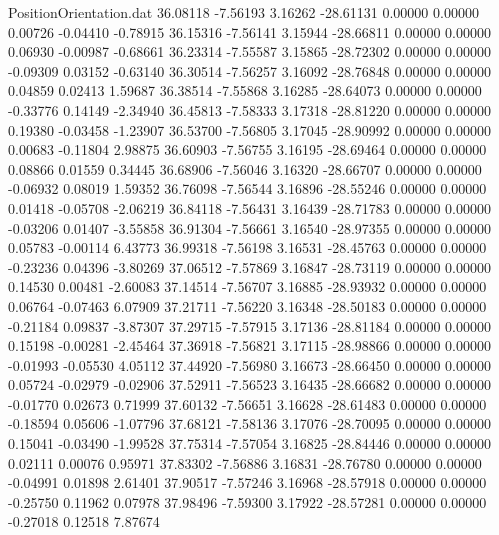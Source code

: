 \begin{filecontents}{PositionOrientation.dat}
  36.08118   -7.56193    3.16262   -28.61131    0.00000    0.00000    0.00726   -0.04410   -0.78915
  36.15316   -7.56141    3.15944   -28.66811    0.00000    0.00000    0.06930   -0.00987   -0.68661
  36.23314   -7.55587    3.15865   -28.72302    0.00000    0.00000   -0.09309    0.03152   -0.63140
  36.30514   -7.56257    3.16092   -28.76848    0.00000    0.00000    0.04859    0.02413    1.59687
  36.38514   -7.55868    3.16285   -28.64073    0.00000    0.00000   -0.33776    0.14149   -2.34940
  36.45813   -7.58333    3.17318   -28.81220    0.00000    0.00000    0.19380   -0.03458   -1.23907
  36.53700   -7.56805    3.17045   -28.90992    0.00000    0.00000    0.00683   -0.11804    2.98875
  36.60903   -7.56755    3.16195   -28.69464    0.00000    0.00000    0.08866    0.01559    0.34445
  36.68906   -7.56046    3.16320   -28.66707    0.00000    0.00000   -0.06932    0.08019    1.59352
  36.76098   -7.56544    3.16896   -28.55246    0.00000    0.00000    0.01418   -0.05708   -2.06219
  36.84118   -7.56431    3.16439   -28.71783    0.00000    0.00000   -0.03206    0.01407   -3.55858
  36.91304   -7.56661    3.16540   -28.97355    0.00000    0.00000    0.05783   -0.00114    6.43773
  36.99318   -7.56198    3.16531   -28.45763    0.00000    0.00000   -0.23236    0.04396   -3.80269
  37.06512   -7.57869    3.16847   -28.73119    0.00000    0.00000    0.14530    0.00481   -2.60083
  37.14514   -7.56707    3.16885   -28.93932    0.00000    0.00000    0.06764   -0.07463    6.07909
  37.21711   -7.56220    3.16348   -28.50183    0.00000    0.00000   -0.21184    0.09837   -3.87307
  37.29715   -7.57915    3.17136   -28.81184    0.00000    0.00000    0.15198   -0.00281   -2.45464
  37.36918   -7.56821    3.17115   -28.98866    0.00000    0.00000   -0.01993   -0.05530    4.05112
  37.44920   -7.56980    3.16673   -28.66450    0.00000    0.00000    0.05724   -0.02979   -0.02906
  37.52911   -7.56523    3.16435   -28.66682    0.00000    0.00000   -0.01770    0.02673    0.71999
  37.60132   -7.56651    3.16628   -28.61483    0.00000    0.00000   -0.18594    0.05606   -1.07796
  37.68121   -7.58136    3.17076   -28.70095    0.00000    0.00000    0.15041   -0.03490   -1.99528
  37.75314   -7.57054    3.16825   -28.84446    0.00000    0.00000    0.02111    0.00076    0.95971
  37.83302   -7.56886    3.16831   -28.76780    0.00000    0.00000   -0.04991    0.01898    2.61401
  37.90517   -7.57246    3.16968   -28.57918    0.00000    0.00000   -0.25750    0.11962    0.07978
  37.98496   -7.59300    3.17922   -28.57281    0.00000    0.00000   -0.27018    0.12518    7.87674

\end{filecontents}
